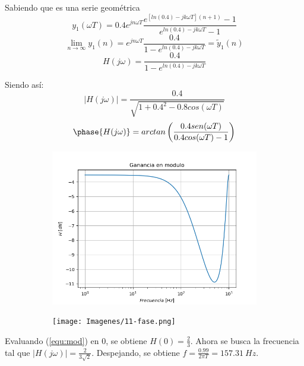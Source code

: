 Sabiendo que es una serie geométrica
\begin{equation*}
	y_1 (\omega T) = 0.4 e^{j n \omega T } \frac{ e^{ \left[ ln \left( 0.4 \right) - j k \omega T \right] \left(n + 1 \right) } - 1}{e^{ ln \left( 0.4 \right) - j k \omega T} - 1}
\end{equation*}
\begin{equation*}
	\lim_{n\to\infty} y_1 (n) = e^{j n \omega T } \frac{0.4}{1 - e^{ ln \left( 0.4 \right) - j k \omega T}} = \tilde{y}_1(n)	
\end{equation*}
\begin{equation*}
	H(j \omega) = \frac{0.4}{1 - e^{ ln \left( 0.4 \right) - j k \omega T}}	
\end{equation*}

Siendo así:
\begin{equation}
	|H(j \omega)| = \frac{0.4}{\sqrt{1 + 0.4^2 - 0.8 cos( \omega T)}}
	\label{equ:mod}	
\end{equation}
\begin{equation}
	\phase{H(j \omega)} = arctan \left( \frac{0.4 sen( \omega T)}{0.4 cos( \omega T) - 1} \right)
\end{equation}

\begin{figure}[H]
\centering
\begin{subfigure}{.49\textwidth}
\centering
	\includegraphics[width=\textwidth]{Imagenes/11-modulo.png}
\end{subfigure}
\begin{subfigure}{.49\textwidth}
\centering
	\texttt{[image: Imagenes/11-fase.png]}
\end{subfigure}
\end{figure}

Evaluando (\ref{equ:mod}) en 0, se obtiene $H(0) = \frac{2}{3}$. Ahora se busca la frecuencia tal que $|H(j \omega)| = \frac{2}{3 \sqrt{2}}$. Despejando, se obtiene $f = \frac{0.99}{2 \pi T} = 157.31 \ Hz$.

